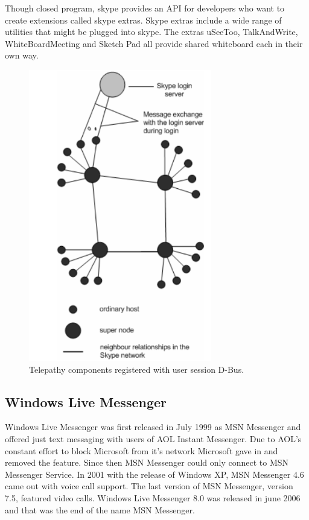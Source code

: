 Though closed program, skype provides an API for developers who want to create extensions called skype extras. Skype extras include a wide range of utilities that might be plugged into skype. The extras uSeeToo, TalkAndWrite, WhiteBoardMeeting and Sketch Pad all provide shared whiteboard each in their own way.    


\begin{figure}[ht]
	\begin{center}
	\includegraphics[width=8cm]{fig/skype-architecture.png}
	\caption{Telepathy components registered with user session D-Bus.\cite{skypeProtocolAnalysis}}
	\label{fig:skypeArchitecture}
\end{center}
\end{figure}

\subsection*{Windows Live Messenger}
Windows Live Messenger was first released in July 1999 as MSN Messenger and offered just text messaging with users of AOL Instant Messenger\cite{AIM}. Due to AOL's constant effort to block Microsoft from it's network Microsoft gave in and removed the feature. Since then MSN Messenger could only connect to MSN Messenger Service. In 2001 with the release of Windows XP, MSN Messenger 4.6 came out with voice call support. The last version of MSN Messenger, version 7.5, featured video calls. Windows Live Messenger 8.0 was released in june 2006 and that was the end of the name MSN Messenger.   

